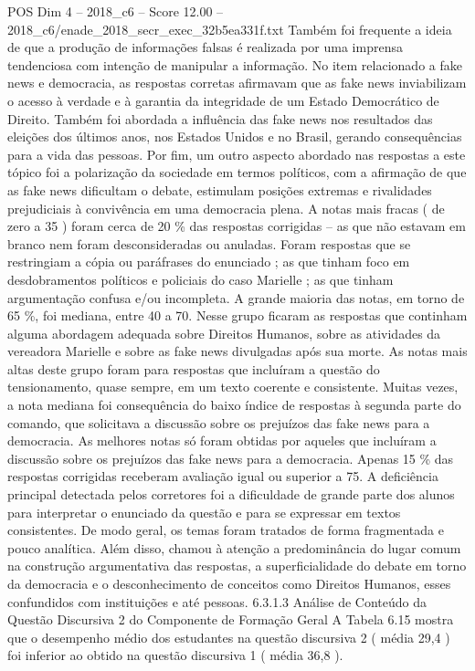 \begin{textsample}{POS Dim 4 – 2018\_c6 – Score 12.00 – 2018\_c6/enade\_2018\_secr\_exec\_32b5ea331f.txt}
Também foi frequente a ideia de que a produção de informações falsas é realizada por uma imprensa tendenciosa com intenção de manipular a informação.
No item relacionado a fake news e democracia, as respostas corretas afirmavam que as fake news inviabilizam o acesso à verdade e à garantia da integridade de um Estado Democrático de Direito.
Também foi abordada a influência das fake news nos resultados das eleições dos últimos anos, nos Estados Unidos e no Brasil, gerando consequências para a vida das pessoas.
Por fim, um outro aspecto abordado nas respostas a este tópico foi a polarização da sociedade em termos políticos, com a afirmação de que as fake news dificultam o debate, estimulam posições extremas e rivalidades prejudiciais à convivência em uma democracia plena.
A notas mais fracas ( de zero a 35 ) foram cerca de 20 \% das respostas corrigidas – as que não estavam em branco nem foram desconsideradas ou anuladas.
Foram respostas que se restringiam a cópia ou paráfrases do enunciado ; as que tinham foco em desdobramentos políticos e policiais do caso Marielle ; as que tinham argumentação confusa e/ou incompleta.
A grande maioria das notas, em torno de 65 \%, foi mediana, entre 40 a 70.
Nesse grupo ficaram as respostas que continham alguma abordagem adequada sobre Direitos Humanos, sobre as atividades da vereadora Marielle e sobre as fake news divulgadas após sua morte.
As notas mais altas deste grupo foram para respostas que incluíram a questão do tensionamento, quase sempre, em um texto coerente e consistente.
Muitas vezes, a nota mediana foi consequência do baixo índice de respostas à segunda parte do comando, que solicitava a discussão sobre os prejuízos das fake news para a democracia.
As melhores notas só foram obtidas por aqueles que incluíram a discussão sobre os prejuízos das fake news para a democracia.
Apenas 15 \% das respostas corrigidas receberam avaliação igual ou superior a 75.
A deficiência principal detectada pelos corretores foi a dificuldade de grande parte dos alunos para interpretar o enunciado da questão e para se expressar em textos consistentes.
De modo geral, os temas foram tratados de forma fragmentada e pouco analítica.
Além disso, chamou à atenção a predominância do lugar comum na construção argumentativa das respostas, a superficialidade do debate em torno da democracia e o desconhecimento de conceitos como Direitos Humanos, esses confundidos com instituições e até pessoas. 6.3.1.3 Análise de Conteúdo da Questão Discursiva 2 do Componente de Formação Geral A Tabela 6.15 mostra que o desempenho médio dos estudantes na questão discursiva 2 ( média 29,4 ) foi inferior ao obtido na questão discursiva 1 ( média 36,8 ).

\end{textsample}
